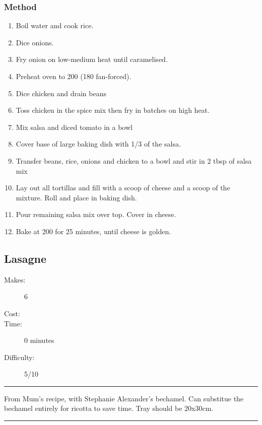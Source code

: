 \documentclass[]{article}
\begin{document}
\subsubsection*{\Large Method}
\begin{enumerate}[font=\huge\color{accent}]
	\item Boil water and cook rice.
	\item Dice onions.
	\item Fry onion on low-medium heat until caramelised.
	\item Preheat oven to 200 (180 fan-forced).
	\item Dice chicken and drain beans
	\item Toss chicken in the spice mix then fry in batches on high heat.
	\item Mix salsa and diced tomato in a bowl
	\item Cover base of large baking dish with 1/3 of the salsa.
	\item Transfer beans, rice, onions and chicken to a bowl and stir in 2 tbsp of salsa mix
	\item Lay out all tortillas and fill with a scoop of cheese and a scoop of the mixture. Roll and place in baking dish.
	\item Pour remaining salsa mix over top. Cover in cheese.
	\item Bake at 200 for 25 minutes, until cheese is golden.
\end{enumerate}
\newpage
{}\label{rec:Lasagne}
\subsection*{\center\huge Lasagne}
\begin{description}
\item[Makes:] 6 
\item[Cost:] \textdollar
\item[Time:] 0 minutes
\item[Difficulty:] 5/10
\end{description}
\vspace{0.2cm}\hrule\vspace{0.5cm}
\begin{adjustwidth}{0.5 cm}{0.5 cm}

From Mum's recipe, with Stephanie Alexander's bechamel. Can substitue the bechamel entirely for ricotta to save time. Tray should be 20x30cm. \hfill{}\color{black}

\end{adjustwidth}
\vspace{0.5cm}\hrule
\end{document}
